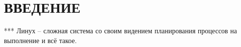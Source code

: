 \section*{ВВЕДЕНИЕ}

*** Линух -- сложная система со своим видением планирования процессов на выполнение и всё такое.

\pagebreak